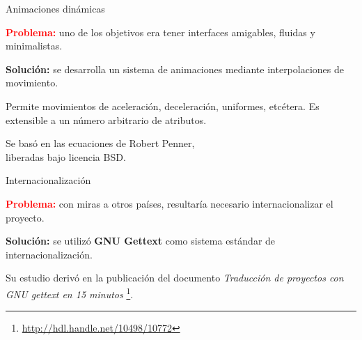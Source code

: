 \begin{frame}{Animaciones dinámicas}
  \begin{center}
    \textcolor{red}{\textbf{Problema:}} uno de los objetivos era tener
    interfaces amigables, fluidas y minimalistas.

    \pause \medskip

    \textcolor{dgreen}{\textbf{Solución:}} se desarrolla un sistema de
    animaciones mediante interpolaciones de movimiento.

    \pause\medskip

    Permite movimientos de aceleración, deceleración, uniformes, etcétera. Es
    extensible a un número arbitrario de atributos.

    \pause\medskip

    Se basó en las ecuaciones de Robert Penner, \\liberadas bajo licencia BSD.
    
  \end{center}  
\end{frame}

\begin{frame}{Internacionalización}
  \begin{center}
    \textcolor{red}{\textbf{Problema:}} con miras a otros países, resultaría
    necesario internacionalizar el proyecto.

    \pause \medskip

    \textcolor{dgreen}{\textbf{Solución:}} se utilizó \textbf{GNU Gettext} como
    sistema estándar de internacionalización. 
    
    \pause\medskip

    Su estudio derivó en la publicación del documento \textit{Traducción de
      proyectos con GNU gettext en 15 minutos}
    \footnote{\url{http://hdl.handle.net/10498/10772}}.

  \end{center}
\end{frame}
